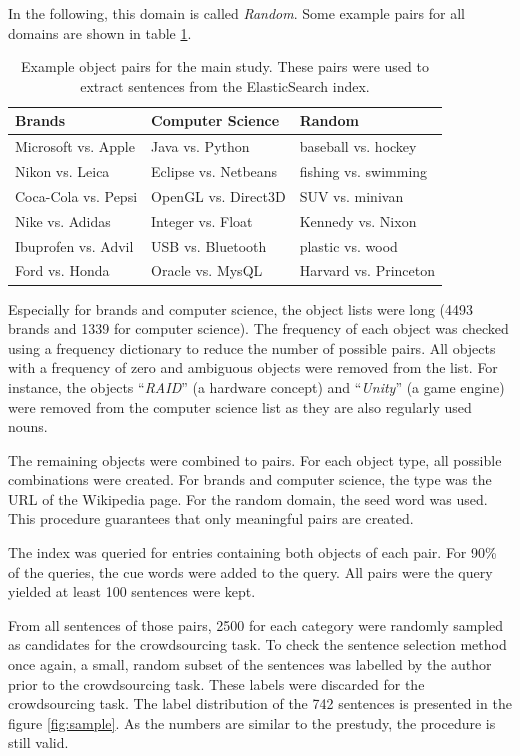 In the following, this domain is called \emph{Random}. Some example pairs for all domains are shown in table \ref{tbl:exp_pairs}.
\begin{table}[htbp]
\centering
\caption{Example object pairs for the main study. These pairs were used to extract sentences from the ElasticSearch index.}
\label{tbl:exp_pairs}

\begin{tabularx}{\textwidth}{XXX}
\toprule
Brands & Computer Science & Random \\
\midrule
Microsoft vs. Apple & Java vs. Python & baseball vs. hockey \\
Nikon vs. Leica & Eclipse vs. Netbeans & fishing vs. swimming\\
Coca-Cola vs. Pepsi & OpenGL vs. Direct3D & SUV vs. minivan\\
Nike vs. Adidas & Integer vs. Float & Kennedy vs. Nixon\\
Ibuprofen vs. Advil & USB vs. Bluetooth & plastic vs. wood\\
Ford vs. Honda & Oracle vs. MysQL & Harvard vs. Princeton\\

\bottomrule

\end{tabularx}

\end{table}

Especially for brands and computer science, the object lists were long (4493 brands and 1339 for computer science). The frequency of each object was checked using a frequency dictionary to reduce the number of possible pairs. All objects with a frequency of zero and ambiguous objects were removed from the list. For instance, the objects \enquote{\emph{RAID}} (a hardware concept) and \enquote{\emph{Unity}}  (a game engine) were removed from the computer science list as they are also regularly used nouns.

The remaining objects were combined to pairs. For each object type, all possible combinations were created. For brands and computer science, the type was the URL of the Wikipedia page. For the random domain, the seed word was used. This procedure guarantees that only meaningful pairs are created.

The index was queried for entries containing both objects of each pair. For 90\% of the queries, the cue words were added to the query. All pairs were the query yielded at least 100 sentences were kept.

From all sentences of those pairs, 2500 for each category were randomly sampled as candidates for the crowdsourcing task. To check the sentence selection method once again, a small, random subset of the sentences was labelled by the author prior to the crowdsourcing task. These labels were discarded for the crowdsourcing task.
The label distribution of the 742 sentences is presented in the figure \ref{fig:sample}. As the numbers are similar to the prestudy, the procedure is still valid.


